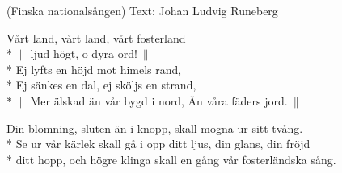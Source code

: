 \begin{SongText}
    \begin{SongInfo}
        (Finska nationalsången)
        Text: Johan Ludvig Runeberg
    \end{SongInfo}
    \begin{SongVerse}
        Vårt land, vårt land, vårt fosterland\\*%
        $\|\:$ljud högt, o dyra ord!$\:\|$\\*%
        Ej lyfts en höjd mot himels rand,\\*%
        Ej sänkes en dal, ej sköljs en strand,\\*%
        $\|\:$Mer älskad än vår bygd i nord, Än våra fäders jord.$\:\|$
    \end{SongVerse}
    \begin{SongVerse}
        Din blomning, sluten än i knopp, skall mogna ur sitt tvång.\\*%
        Se ur vår kärlek skall gå i opp ditt ljus, din glans, din fröjd\\*%
        ditt hopp, och högre klinga skall en gång vår fosterländska sång.
    \end{SongVerse}
\end{SongText}